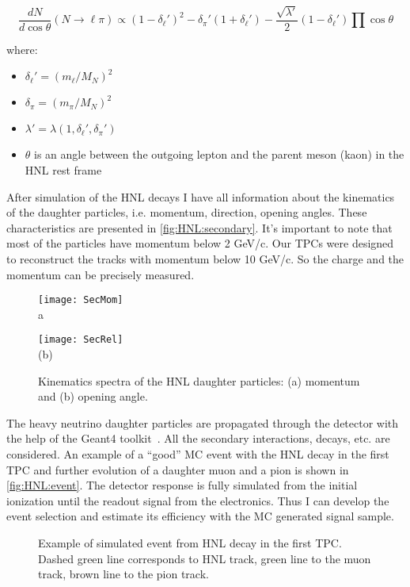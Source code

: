 \documentclass[../main.tex]{subfiles}
\begin{document}
\begin{equation}
    \frac{dN}{d\cos\theta}\left(N\to\ell\pi\right)\propto\left(1-\delta_\ell'\right)^2-\delta_\pi'\left(1+\delta_\ell'\right)-\frac{\sqrt{\lambda'}}{2}\left(1-\delta_\ell'\right)\prod\cos\theta
\end{equation}

where:
\begin{itemize}
    \item $\delta_\ell'=\left(m_\ell/M_N\right)^2$
    \item $\delta_\pi=\left(m_\pi/M_N\right)^2$
    \item $\lambda'=\lambda\left(1, \delta_\ell', \delta_\pi'\right)$
    \item $\theta$ is an angle between the outgoing lepton and the parent meson (kaon) in the HNL rest frame
\end{itemize}


After simulation of the HNL decays I have all information about the kinematics of the daughter particles, i.e. momentum, direction, opening angles. These characteristics are presented in \autoref{fig:HNL:secondary}. It's important to note that most of the particles have momentum below 2 GeV/c. Our TPCs were designed to reconstruct the tracks with momentum below 10 GeV/c. So the charge and the momentum can be precisely measured.

\begin{figure}[!ht]
    \begin{minipage}{0.49\linewidth}
        \centering
        \texttt{[image: SecMom]} \\ {a}
    \end{minipage}
    \begin{minipage}{0.49\linewidth}
    \texttt{[image: SecRel]} \\ (b)

    \end{minipage}
        \caption{Kinematics spectra of the HNL daughter particles: (a) momentum and (b) opening angle.}
    \label{fig:HNL:secondary}
\end{figure}

The heavy neutrino daughter particles are propagated through the detector with the help of the Geant4 toolkit~\cite{Agostinelli2003}. All the secondary interactions, decays, etc. are considered. An example of a ``good'' MC event with the HNL decay in the first TPC and further evolution of a daughter muon and a pion is shown in \autoref{fig:HNL:event}. The detector response is fully simulated from the initial ionization until the readout signal from the electronics. Thus I can develop the event selection and estimate its efficiency with the MC generated signal sample.
\begin{figure}[!ht]
    \caption{Example of simulated event from HNL decay in the first TPC. Dashed green line corresponds to HNL track, green line to the muon track, brown line to the pion track.}
    \label{fig:HNL:event}
\end{figure}
\end{document}
